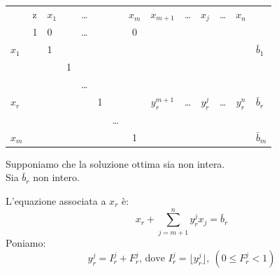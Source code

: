 \begin{table}[h]
	\centering
	\begin{tabular}{llllllcccccccc}
		&                       z & $x_{1}$ &    & \dots &     &      & $x_{m}$ & $x_{m+1}$     & \dots & $x_{j}$     & \dots & $x_{n}$     & \\ \cline{2-14}
		& \multicolumn{1}{|l|}{1} & 0       &    & \dots &     &      & 0       &               &     &             &     &             & \multicolumn{1}{|l|}{} \\ \cline{2-14}
		$x_{1}$ & \multicolumn{1}{|l|}{}  & 1       &    &     &     &      &         &               &     &             &     &	           & \multicolumn{1}{|l|}{$\bar{b}_{1}$} \\
		& \multicolumn{1}{|l|}{}  &         & 1  &     &     &      &         &               &     &             &     &             & \multicolumn{1}{|l|}{} \\
		& \multicolumn{1}{|l|}{}  &         &    & \dots &     &      &         &               &     &             &     &             & \multicolumn{1}{|l|}{} \\
		$x_{r}$ & \multicolumn{1}{|l|}{}  &         &    &     & 1   &      &         & $y_{r}^{m+1}$ & \dots & $y_{r}^{j}$ & \dots & $y_{r}^{n}$ & \multicolumn{1}{|l|}{$\bar{b}_{r}$} \\
		& \multicolumn{1}{|l|}{}  &         &    &     &     & \dots  &         &               &     &             &     &             & \multicolumn{1}{|l|}{} \\
		$x_{m}$ & \multicolumn{1}{|l|}{}  &         &    &     &     &      & 1       &               &     &             &     &             & \multicolumn{1}{|l|}{$\bar{b}_{m}$} \\ \cline{2-14}
	\end{tabular}
\end{table}

Supponiamo che la soluzione ottima sia non intera.\\
Sia $\bar{b}_{r}$ non intero.

L'equazione associata a $x_{r}$ è:
\begin{equation}\label{eq:2.1}
x_{r} + \sum_{j=m+1}^{n} y_{r}^{j} x_{j} = \bar{b}_{r}
\end{equation}
Poniamo:
\begin{equation*}
y_{r}^{j} = I_{r}^{j} + F_{r}^{j}\text{, dove }I_{r}^{j} = \lfloor y_{r}^{j} \rfloor,\ (0 \le F_{r}^{j} < 1)
\end{equation*}

